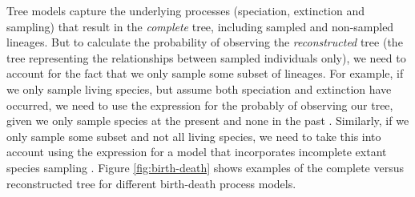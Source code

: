 \documentclass[11pt]{article}
\newcommand{\rw}[1]{{\textcolor{red}{[RW: #1]}}} %
\newcommand{\aw}[1]{{\textcolor{armygreen}{[AW: #1]}}} %
\begin{document}
Tree models capture the underlying processes (speciation, extinction and sampling) that result in the \textit{complete} tree, including sampled and non-sampled lineages. But to calculate the probability of observing the  \textit{reconstructed} tree (the tree representing the relationships between sampled individuals only), we need to account for the fact that we only sample some subset of lineages.
For example, if we only sample living species, but assume both speciation and extinction have occurred, we need to use the expression for the probably of observing our tree, given we only sample species at the present and none in the past \cite{Thompson1975,Gernhard2008, Stadler2009}.  Similarly, if we only sample some subset and not all living species, we need to take this into account using the expression for a model that incorporates incomplete extant species sampling \cite{Yang1997,Stadler2009}.
Figure \ref{fig:birth-death} shows examples of the complete versus reconstructed tree for different birth-death process models.


\end{document}
